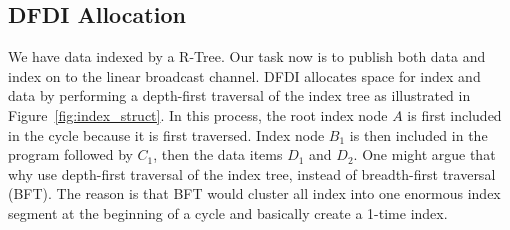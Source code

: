 %
%
%
%

\subsection{DFDI Allocation}

We have data indexed by a R-Tree. Our task now is to publish both
data and index on to the linear broadcast channel. DFDI allocates
space for index and data by performing a depth-first traversal of
the index tree as illustrated in Figure~\ref{fig:index_struct}. In
this process, the root index node $A$ is first included in the
cycle because it is first traversed. Index node $B_1$ is then
included in the program followed by $C_1$, then the data items
$D_1$ and $D_2$. One might argue that why use depth-first
traversal of the index tree, instead of breadth-first traversal
(BFT). The reason is that BFT would cluster all index into one
enormous index segment at the beginning of a cycle and basically
create a 1-time index.

